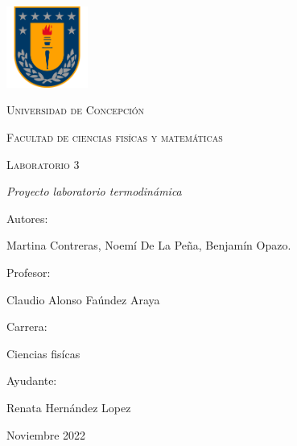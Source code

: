 \documentclass[a4paper, 12p]{article}
\begin{document}
\begin{titlepage}
      \begin{center}     
              
            \includegraphics[width=0.2\textwidth]{img/escudo_udec.png}                       %
            
            
            
            \vspace{1cm}
            \textsc{{\LARGE Universidad de Concepción}}
            
            \vspace{1cm}
            {\scshape\Large Facultad de ciencias fisícas y matemáticas \par}
            \vspace{2cm}
            {\scshape\Huge Laboratorio 3 \par}
            \vspace{2cm}
            {\itshape\Large Proyecto laboratorio termodinámica \par}
            \vfill
            {\Large Autores: \par}
            {\Large Martina Contreras, Noemí De La Peña, Benjamín Opazo. \par}
            \vfill
            \vfill
            {\Large Profesor: \par}
            {\Large Claudio Alonso Faúndez Araya \par}
            \vfill
            \vfill
            {\Large Carrera: \par}
            {\Large Ciencias fisícas \par}
            \vfill
            \vfill
            {\Large Ayudante: \par}
            {\Large Renata Hernández Lopez \par}
            \vfill
            {\Large Noviembre 2022 \par}
      \end{center}
\end{titlepage}            
 

\tableofcontents
\newpage

\end{document}
